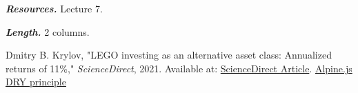 \documentclass[letterpaper,twocolumn]{article}
\newcommand{\myparagraph}[1]{\vspace{0.1cm}\noindent \textbf{\textit{#1.}}}
\begin{document}
\myparagraph{Resources} Lecture 7.

\myparagraph{Length} 2 columns.




\begin{thebibliography}{9}
    
    Dmitry B. Krylov, "LEGO investing as an alternative asset class: Annualized returns of 11\%," 
    \textit{ScienceDirect}, 2021. Available at: \href{https://www.sciencedirect.com/science/article/abs/pii/S0275531921001604?via%3Dihub}{ScienceDirect Article}.
     \href{https://alpinejs.dev}{Alpine.js}
     \href{https://en.wikipedia.org/wiki/Don%27t_repeat_yourself}{DRY principle}
    
\end{thebibliography}
\end{document}

